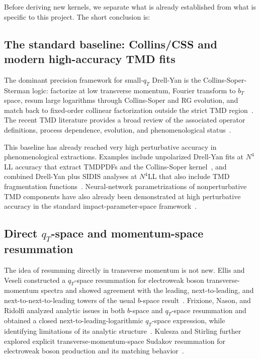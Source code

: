 \documentclass[11pt]{article}
\begin{document}
Before deriving new kernels, we separate what is already established from what is
specific to this project. The short conclusion is:
\begin{center}
\end{center}

\subsection{The standard baseline: Collins/CSS and modern high-accuracy TMD fits}

The dominant precision framework for small-$q_T$ Drell-Yan is the Collins-Soper-Sterman
logic: factorize at low transverse momentum, Fourier transform to $b_T$ space, resum
large logarithms through Collins-Soper and RG evolution, and match back to fixed-order
collinear factorization outside the strict TMD region~\cite{CollinsSoper1981,CSS1985,Collins2011}.
The recent TMD literature provides a broad review of the associated operator definitions,
process dependence, evolution, and phenomenological status~\cite{TMDHandbook2023}.

This baseline has already reached very high perturbative accuracy in phenomenological
extractions. Examples include unpolarized Drell-Yan fits at $N^4$LL accuracy that extract
TMDPDFs and the Collins-Soper kernel~\cite{MoosScimemiVladimirovZurita2024}, and
combined Drell-Yan plus SIDIS analyses at $N^4$LL that also include TMD fragmentation
functions~\cite{MoosScimemiVladimirovZurita2025}. Neural-network parametrizations of
nonperturbative TMD components have also already been demonstrated at high perturbative
accuracy in the standard impact-parameter-space framework~\cite{BacchettaEtAl2025NN}.

\subsection{Direct $q_T$-space and momentum-space resummation}

The idea of resumming directly in transverse momentum is not new. Ellis and Veseli
constructed a $q_T$-space resummation for electroweak boson transverse-momentum spectra
and showed agreement with the leading, next-to-leading, and next-to-next-to-leading towers
of the usual $b$-space result~\cite{EllisVeseli1998}. Frixione, Nason, and Ridolfi analyzed
analytic issues in both $b$-space and $q_T$-space resummation and obtained a closed
next-to-leading-logarithmic $q_T$-space expression, while identifying limitations of its
analytic structure~\cite{FrixioneNasonRidolfi1999}. Kulesza and Stirling further explored
explicit transverse-momentum-space Sudakov resummation for electroweak boson production
and its matching behavior~\cite{KuleszaStirling1999,KuleszaStirling2000}.
\end{document}

